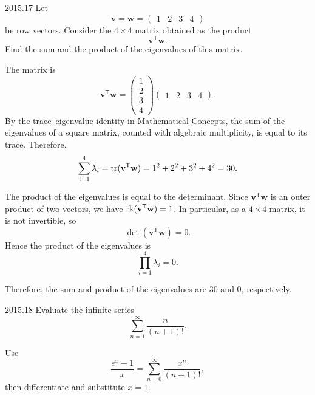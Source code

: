     \begin{pastproblem}{2015.17}
        Let
        \[
            \mathbf{v}=\mathbf{w}=
            \begin{pmatrix}
                1 & 2 & 3 & 4
            \end{pmatrix}
        \]
        be row vectors. Consider the $4\times 4$ matrix obtained as the product
        \[
            \mathbf{v}^{\mathsf T}\mathbf{w}.
        \]
        Find the sum and the product of the eigenvalues of this matrix.
    \end{pastproblem}

    \begin{solution}
        The matrix is
        \[
            \mathbf{v}^{\mathsf T}\mathbf{w}
            =
            \begin{pmatrix}
                1 \\
                2 \\
                3 \\
                4
            \end{pmatrix}
            \begin{pmatrix}
                1 & 2 & 3 & 4
            \end{pmatrix}.
        \]
        By the trace--eigenvalue identity in Mathematical Concepts, the sum of the eigenvalues of a square matrix, counted with algebraic multiplicity, is equal
        to its trace. Therefore,
        \[
            \sum_{i=1}^{4}\lambda_i
            =
            \operatorname{tr}(\mathbf{v}^{\mathsf T}\mathbf{w})
            =
            1^2+2^2+3^2+4^2
            =
            30.
        \]

        The product of the eigenvalues is equal to the determinant. Since $\mathbf{v}^{\mathsf
        T}\mathbf{w}$ is an outer product of two vectors, we have $\operatorname{rk}(\mathbf{v}^{\mathsf
        T}\mathbf{w})=1$. In particular, as a $4\times 4$ matrix, it is not invertible, so
        \[
            \det(\mathbf{v}^{\mathsf T}\mathbf{w})=0.
        \]
        Hence the product of the eigenvalues is
        \[
            \prod_{i=1}^{4}\lambda_i=0.
        \]

        Therefore, the sum and product of the eigenvalues are $\boxed{30\text{ and }0}$,
        respectively.
    \end{solution}

    \begin{pastproblem}{2015.18}
        Evaluate the infinite series
        \[
            \sum_{n=1}^{\infty}\frac{n}{(n+1)!}.
        \]

        \begin{hint}
            Use
            \[
                \frac{e^x-1}{x}
                =
                \sum_{n=0}^{\infty}\frac{x^n}{(n+1)!},
            \]
            then differentiate and substitute $x=1$.
        \end{hint}
    \end{pastproblem}

